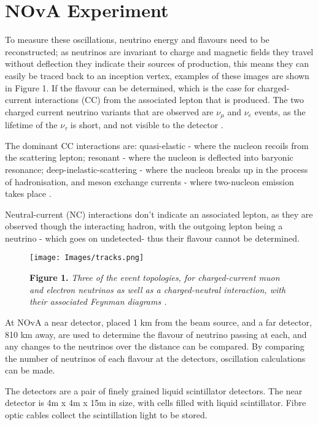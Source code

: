 \section{NOvA Experiment}

\noindent To measure these oscillations, neutrino energy and flavours need to be reconstructed; as neutrinos are invariant to charge and magnetic fields they travel without deflection they indicate their sources of production, this means they can easily be traced back to an inception vertex, examples of these images are shown in Figure 1. If the flavour can be determined, which is the case for charged-current interactions (CC) from the associated lepton that is produced. The two charged current neutrino variants that are observed are $\nu_\mu$ and  $\nu_e$ events, as the lifetime of the  $\nu_\tau$ is short, and not visible to the detector \cite{Aurisano}.\medskip

\noindent The dominant CC interactions are: quasi-elastic - where the nucleon recoils from the scattering lepton; resonant - where the nucleon is deflected into baryonic resonance; deep-inelastic-scattering - where the nucleon breaks up in the process of hadronisation, and meson exchange currents - where two-nucleon emission takes place \cite{Aurisano}.\medskip

\noindent Neutral-current (NC) interactions don’t indicate an associated lepton, as they are observed though the interacting hadron, with the outgoing lepton being a neutrino - which goes on undetected- thus their flavour cannot be determined. \medskip

\begin{figure}
\centering
\texttt{[image: Images/tracks.png]}

 \textbf{Figure 1.} \textit{Three of the event topologies, for charged-current muon and electron neutrinos as well as a charged-neutral interaction, with their associated Feynman diagrams \cite{Singh}.}
\end{figure}

\noindent At NOvA a near detector, placed 1 km from the beam source, and a far detector, 810 km away, are used to determine the flavour of neutrino passing at each, and any changes to the neutrinos over the distance can be compared. By comparing the number of neutrinos of each flavour at the detectors, oscillation calculations can be made. \medskip

\noindent The detectors are a pair of finely grained liquid scintillator detectors. The near detector is 4m x 4m x 15m in size, with cells filled with liquid scintillator. Fibre optic cables collect the scintillation light to be stored. \medskip

